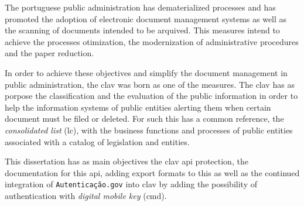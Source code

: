 The portuguese public administration has dematerialized processes and has promoted the adoption of electronic document management systems as well as the scanning of documents intended to be arquived. This measures intend to achieve the processes otimization, the modernization of administrative procedures and the paper reduction. 

In order to achieve these objectives and simplify the document management in public administration, the \acrshort{clav} was born as one of the measures. The \acrshort{clav} has as porpose the classification and the evaluation of the public information in order to help the information systems of public entities alerting them when certain document must be filed or deleted. For such this has a common reference, the \textit{consolidated list} (\acrlong{lc}), with the business functions and processes of public entities associated with a catalog of legislation and entities.

This dissertation has as main objectives the \acrshort{clav} \acrshort{api} protection, the documentation for this \acrshort{api}, adding export formats to this as well as the continued integration of \texttt{Autenticação.gov} into \acrshort{clav} by adding the possibility of authentication with \textit{digital mobile key} (\acrlong{cmd}).
